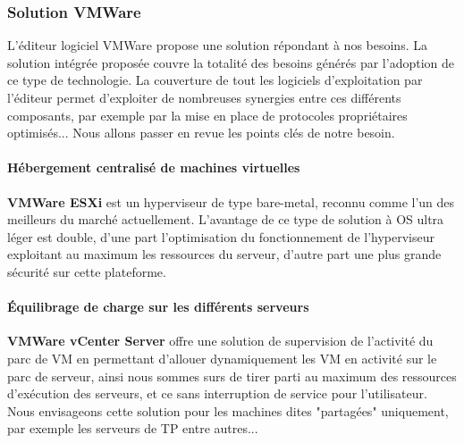 \subsubsection{Solution VMWare}

L'éditeur logiciel VMWare propose une solution répondant à nos besoins. La solution intégrée proposée couvre la totalité des besoins générés par l'adoption de ce type de technologie. La couverture de tout les logiciels d'exploitation par l'éditeur permet d'exploiter de nombreuses synergies entre ces différents composants, par exemple par la mise en place de protocoles propriétaires optimisés... Nous allons passer en revue les points clés de notre besoin.\\

\paragraph{Hébergement centralisé de machines virtuelles}

\textbf{VMWare ESXi} est un hyperviseur de type bare-metal, reconnu comme l'un des meilleurs du marché actuellement. L'avantage de ce type de solution à OS ultra léger est double, d'une part l'optimisation du fonctionnement de l'hyperviseur exploitant au maximum les ressources du serveur, d'autre part une plus grande sécurité sur cette plateforme.

\paragraph{Équilibrage de charge sur les différents serveurs}

\textbf{VMWare vCenter Server} offre une solution de supervision de l'activité du parc de VM en permettant d'allouer dynamiquement les VM en activité sur le parc de serveur, ainsi nous sommes surs de tirer parti au maximum des ressources d'exécution des serveurs, et ce sans interruption de service pour l'utilisateur. Nous envisageons cette solution pour les machines dites "partagées" uniquement, par exemple les serveurs de TP entre autres...

